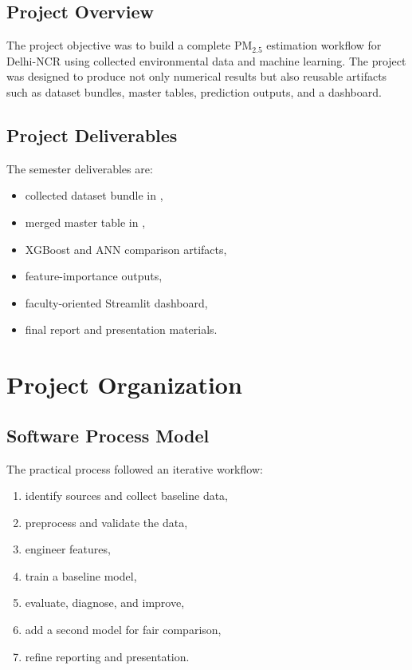 \documentclass[12pt,a4paper]{report}
\begin{document}
\subsection{Project Overview}
The project objective was to build a complete PM$_{2.5}$ estimation workflow for Delhi-NCR using collected environmental data and machine learning. The project was designed to produce not only numerical results but also reusable artifacts such as dataset bundles, master tables, prediction outputs, and a dashboard.

\subsection{Project Deliverables}
The semester deliverables are:

\begin{itemize}[leftmargin=1.3cm]
    \item collected dataset bundle in ,
    \item merged master table in ,
    \item XGBoost and ANN comparison artifacts,
    \item feature-importance outputs,
    \item faculty-oriented Streamlit dashboard,
    \item final report and presentation materials.
\end{itemize}

\section{Project Organization}

\subsection{Software Process Model}
The practical process followed an iterative workflow:

\begin{enumerate}[leftmargin=1.3cm]
    \item identify sources and collect baseline data,
    \item preprocess and validate the data,
    \item engineer features,
    \item train a baseline model,
    \item evaluate, diagnose, and improve,
    \item add a second model for fair comparison,
    \item refine reporting and presentation.
\end{enumerate}
\end{document}
